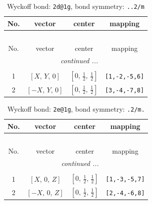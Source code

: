 \documentclass[fleqn,8pt]{jsarticle}
\begin{document}
\renewcommand{\arraystretch}{1.2}
\begin{longtable}{cccc}
\caption{Wyckoff bond: {\tt 2d@1g}, bond symmetry: {\tt ..2/m}}
 \\
 \hline \hline
No. & vector & center & mapping \\ \hline \endfirsthead

\multicolumn{3}{l}{\tablename\ \thetable{}} \\
 \hline \hline
No. & vector & center & mapping \\ \hline \endhead

 \hline \hline
\multicolumn{3}{r}{\footnotesize\it continued ...} \\ \endfoot

 \hline \hline
\multicolumn{3}{r}{} \\ \endlastfoot

1 & $\left[ X,\, Y,\, 0 \right]$ & $\left[ 0,\, \frac{1}{2},\, \frac{1}{2} \right]$ & {\tt [1,-2,-5,6]} \\ \hline
2 & $\left[ - X,\, Y,\, 0 \right]$ & $\left[ 0,\, \frac{1}{2},\, \frac{1}{2} \right]$ & {\tt [3,-4,-7,8]} \\
\end{longtable}
\renewcommand{\arraystretch}{1.2}
\begin{longtable}{cccc}
\caption{Wyckoff bond: {\tt 2e@1g}, bond symmetry: {\tt .2/m.}}
 \\
 \hline \hline
No. & vector & center & mapping \\ \hline \endfirsthead

\multicolumn{3}{l}{\tablename\ \thetable{}} \\
 \hline \hline
No. & vector & center & mapping \\ \hline \endhead

 \hline \hline
\multicolumn{3}{r}{\footnotesize\it continued ...} \\ \endfoot

 \hline \hline
\multicolumn{3}{r}{} \\ \endlastfoot

1 & $\left[ X,\, 0,\, Z \right]$ & $\left[ 0,\, \frac{1}{2},\, \frac{1}{2} \right]$ & {\tt [1,-3,-5,7]} \\ \hline
2 & $\left[ - X,\, 0,\, Z \right]$ & $\left[ 0,\, \frac{1}{2},\, \frac{1}{2} \right]$ & {\tt [2,-4,-6,8]} \\
\end{longtable}
\renewcommand{\arraystretch}{1.2}
\end{document}
